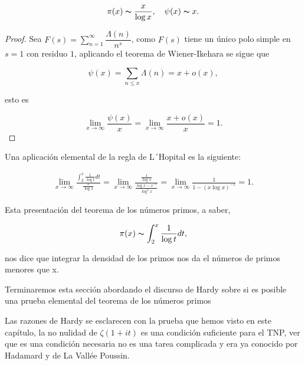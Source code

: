 \begin{corollary}
$$\pi(x)\thicksim \frac{x}{\log x},\quad \psi(x)\thicksim x.$$
\end{corollary}

\begin{proof}
    Sea $F(s)=\displaystyle\sum_{n=1}^{\infty} \dfrac{\Lambda(n)}{n^s}$, como $F(s)$ tiene un único polo simple en $s=1$ con residuo $1$, aplicando el teorema de Wiener-Ikehara se sigue que

    $$\psi(x)=\sum_{n\leq x} \Lambda(n)=x+o(x),$$

    esto es

    $$\lim_{x \to \infty} \frac{\psi(x)}{x}=\lim_{x \to \infty} \frac{x+o(x)}{x}=1.$$
\end{proof}

\begin{note}
Una aplicación elemental de la regla de L´Hopital es la siguiente:

\begin{align*}
    \displaystyle\lim_{x \to \infty} \frac{\displaystyle\int_2^x \displaystyle\frac{1}{\log t}dt}{\displaystyle\frac{x}{\log x}}=\lim_{x \to \infty} \frac{\displaystyle\frac{1}{\log x}}{\displaystyle\frac{\log x-x^{-1}}{\log^2x}}=\lim_{x \to \infty} \frac{1}{1-(x\log x)^{-1}}=1
.\end{align*}

Esta presentación del teorema de los números primos, a saber,

$$\pi(x)\thicksim \int_2^x\frac{1}{\log t}dt,$$

nos dice que integrar la densidad de los primos nos da el números de primos menores que x.\\
\end{note}

Terminaremos esta sección abordando el discurso de Hardy sobre si es posible una prueba elemental del teorema de los números primos\\


Las razones de Hardy se esclarecen con la prueba que hemos visto en este capítulo, la no nulidad de $\zeta(1+it)$ es una condición suficiente para el TNP, ver que es una condición necesaria no es una tarea complicada y era ya conocido por Hadamard y de La Vallée Poussin.\\

